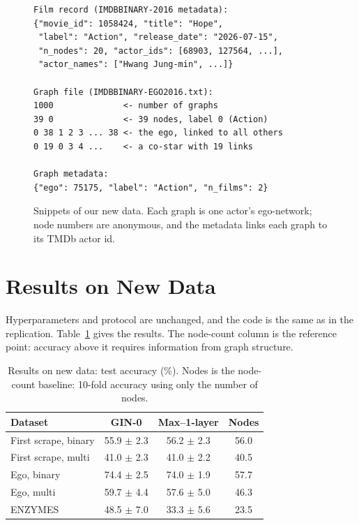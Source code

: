 \documentclass[11pt]{article}
\begin{document}
\begin{figure}[t]
\scriptsize
\begin{verbatim}
Film record (IMDBBINARY-2016 metadata):
{"movie_id": 1058424, "title": "Hope",
 "label": "Action", "release_date": "2026-07-15",
 "n_nodes": 20, "actor_ids": [68903, 127564, ...],
 "actor_names": ["Hwang Jung-min", ...]}

Graph file (IMDBBINARY-EGO2016.txt):
1000              <- number of graphs
39 0              <- 39 nodes, label 0 (Action)
0 38 1 2 3 ... 38 <- the ego, linked to all others
0 19 0 3 4 ...    <- a co-star with 19 links

Graph metadata:
{"ego": 75175, "label": "Action", "n_films": 2}
\end{verbatim}
\caption{Snippets of our new data. Each graph is one actor's ego-network; node numbers are anonymous, and the metadata links each graph to its TMDb actor id.}
\label{fig:newsnippet}
\end{figure}

\section{Results on New Data}
\label{sec:results}

Hyperparameters and protocol are unchanged, and the code is the same as in the replication. Table~\ref{tab:newresults} gives the results. The node-count column is the reference point: accuracy above it requires information from graph structure.

\begin{table}[t]
\centering
\small
\setlength{\tabcolsep}{3pt}
\begin{tabular}{lccc}
\toprule
Dataset & GIN-0 & Max--1-layer & Nodes \\
\midrule
First scrape, binary & 55.9 $\pm$ 2.3 & 56.2 $\pm$ 2.3 & 56.0 \\
First scrape, multi & 41.0 $\pm$ 2.3 & 41.0 $\pm$ 2.2 & 40.5 \\
Ego, binary & 74.4 $\pm$ 2.5 & 74.0 $\pm$ 1.9 & 57.7 \\
Ego, multi & 59.7 $\pm$ 4.4 & 57.6 $\pm$ 5.0 & 46.3 \\
ENZYMES & 48.5 $\pm$ 7.0 & 33.3 $\pm$ 5.6 & 23.5 \\
\bottomrule
\end{tabular}
\caption{Results on new data: test accuracy (\%). Nodes is the node-count baseline: 10-fold accuracy using only the number of nodes.}
\label{tab:newresults}
\end{table}
\end{document}
